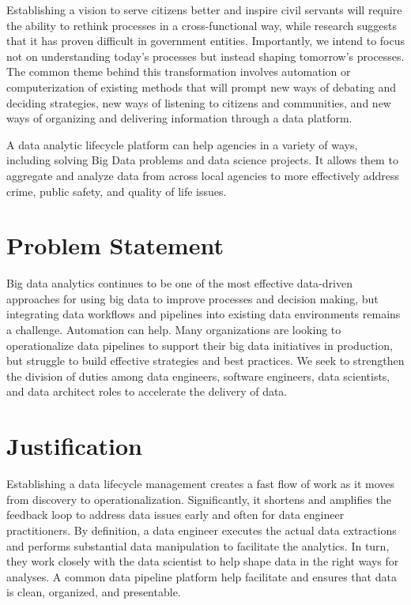 \documentclass[conference]{IEEEtran}
\begin{document}
Establishing a vision to serve citizens better and inspire civil servants will require the ability to rethink processes in a cross-functional way, while research suggests that it has proven difficult in government entities\cite{Weerakkody}.  Importantly, we intend to focus not on understanding today's processes but instead shaping tomorrow's processes. The common theme behind this transformation involves automation or computerization of existing methods that will prompt new ways of debating and deciding strategies, new ways of listening to citizens and communities, and new ways of organizing and delivering information\cite{eGov} through a data platform.  

A data analytic lifecycle platform can help agencies in a variety of ways, including solving Big Data problems and data science projects. It allows them to aggregate and analyze data from across local agencies to more effectively address crime, public safety, and quality of life issues. 
%
%
\section{Problem Statement}
Big data analytics continues to be one of the most effective data-driven approaches for using big data to improve processes and decision making, but integrating data workflows and pipelines into existing data environments remains a challenge. Automation can help.  Many organizations are looking to operationalize data pipelines to support their big data initiatives in production, but struggle to build effective strategies and best practices. We seek to strengthen the division of duties among data engineers, software engineers, data scientists, and data architect roles to accelerate the delivery of data.


\section{Justification}
Establishing a data lifecycle management creates a fast flow of work as it moves from discovery to operationalization.  Significantly, it shortens and amplifies the feedback loop to address data issues early and often for data engineer practitioners.  By definition, a data engineer executes the actual data extractions and performs substantial data manipulation to facilitate the analytics.  In turn, they work closely with the data scientist to help shape data in the right ways for analyses.  A common data pipeline platform help facilitate and ensures that data is clean, organized, and presentable.
\end{document}
